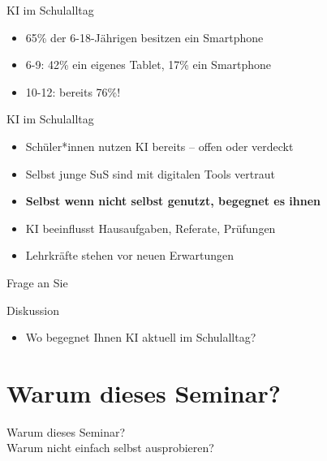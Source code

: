 \documentclass[14pt, aspectratio=169]{beamer}
\begin{document}
\begin{frame}{KI im Schulalltag}
\begin{itemize}
    \item 65\% der 6-18-Jährigen besitzen ein Smartphone
    \item 6-9: 42\% ein eigenes Tablet, 17\% ein Smartphone
    \item 10-12: bereits 76\%!
\end{itemize}
\vspace{0.5cm}
\begin{center}
\footnotesize \autocite{ev_ab_2024}
\end{center}
\end{frame}

\begin{frame}{KI im Schulalltag}
\begin{itemize}
    \item Schüler*innen nutzen KI bereits – offen oder verdeckt
    \item Selbst junge SuS sind mit digitalen Tools vertraut
    \item \textbf{Selbst wenn nicht selbst genutzt, begegnet es ihnen}
    \item KI beeinflusst Hausaufgaben, Referate, Prüfungen
    \item Lehrkräfte stehen vor neuen Erwartungen
\end{itemize}
\end{frame}

\begin{frame}{Frage an Sie}
\begin{block}{Diskussion}
\begin{itemize}
    \item Wo begegnet Ihnen KI aktuell im Schulalltag?
\end{itemize}
\end{block}
\end{frame}



\section{Warum dieses Seminar?}

\begin{frame}{}
\begin{center}
    \Large Warum dieses Seminar?\\
    Warum nicht einfach selbst ausprobieren?
\end{center}
\end{frame}
\end{document}
